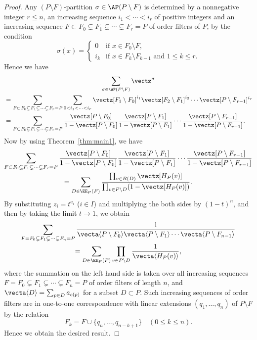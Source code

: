 \begin{proof}
Any $(P \setminus F)$-partition $\sigma \in \AP(P \setminus F)$ is determined by 
a nonnegative integer $r\leq n$, an increasing sequence $i_1 < \cdots < i_r$ of positive integers 
and an increasing sequence $F \subset F_0 \subsetneq F_1 \subsetneq \cdots \subsetneq F_r = P$ 
of order filters of $P$, by the condition
$$
\sigma(x)
 =
\begin{cases}
 0 &\text{if $x \in F_0 \setminus F$,} \\
 i_k &\text{if $x \in F_k \setminus F_{k-1}$ and $1 \le k \le r$.}
\end{cases}
$$
Hence we have
\begin{multline*}
\sum_{\sigma \in \AP(P \setminus F)} \vectz^\sigma
\\
\begin{aligned}
&
=
\sum_{F \subset F_0 \subsetneq F_1 \subsetneq \cdots \subsetneq F_r = P}
\sum_{0 < i_1 < \cdots < i_r}
 \vectz[F_1 \setminus F_0]^{i_1} \vectz[F_2 \setminus F_1]^{i_2} \cdots \vectz[P \setminus F_{r-1}]^{i_r}
\\
&
=
\sum_{F \subset F_0 \subsetneq F_1 \subsetneq \cdots \subsetneq F_r = P}
 \frac{ \vectz[P \setminus F_0] }
 { 1 - \vectz[P \setminus F_0] }
 \frac{ \vectz[P \setminus F_1] }
 { 1 - \vectz[P \setminus F_1] }
 \cdots
 \frac{ \vectz[P \setminus F_{r-1}] }
 { 1 - \vectz[P \setminus F_{r-1}] }.
\end{aligned}
\end{multline*}
Now by using Theorem~\ref{thm:main1}, we have
\begin{multline*}
\sum_{F \subset F_0 \subsetneq F_1 \subsetneq \cdots \subsetneq F_r = P}
 \frac{ \vectz[P \setminus F_0] }
 { 1 - \vectz[P \setminus F_0] }
 \frac{ \vectz[P \setminus F_1] }
 { 1 - \vectz[P \setminus F_1] }
 \cdots
 \frac{ \vectz[P \setminus F_{r-1}] }
 { 1 - \vectz[P \setminus F_{r-1}] }
\\
 =
\sum_{D \in \EE_P(F)}
 \frac{ \prod_{v \in B(D)} \vectz[H_P(v)] }
 { \prod_{v \in P \setminus D} ( 1 - \vectz[H_P(v)] ) }.
\end{multline*}
By substituting $z_i = t^{a_i}$ ($i \in I$) and multiplying the both sides by $(1-t)^n$, 
and then by taking the limit $t \to 1$, we obtain
\begin{multline*}
\sum_{F = F_0 \subsetneq F_1 \subsetneq \cdots \subsetneq F_n = P}
 \frac{ 1 }
 { \vecta \langle P \setminus F_0 \rangle \vecta \langle P \setminus F_1 \rangle 
 \cdots \vecta \langle P \setminus F_{n-1} \rangle
 }
\\
 =
\sum_{D \in \EE_P(F)}
 \prod_{v \in P \setminus D}
 \frac{ 1 }
 { \vecta \langle H_P(v) \rangle },
\end{multline*}
where the summation on the left hand side is taken over all increasing sequences 
$F = F_0 \subsetneq F_1 \subsetneq \cdots \subsetneq F_n = P$ of order filters of length $n$, 
and $\vecta \langle D \rangle = \sum_{p \in D} a_{c(p)}$ for a subset $D \subset P$.
Such increasing sequences of order filters are in one-to-one correspondence 
with linear extensions $(q_1, \ldots, q_n)$ of $P \setminus F$ by the relation
$$
F_k = F \cup \{ q_n, \ldots, q_{n-k+1} \}
\quad(0 \le k \le n).
$$
Hence we obtain the desired result.
\end{proof}

